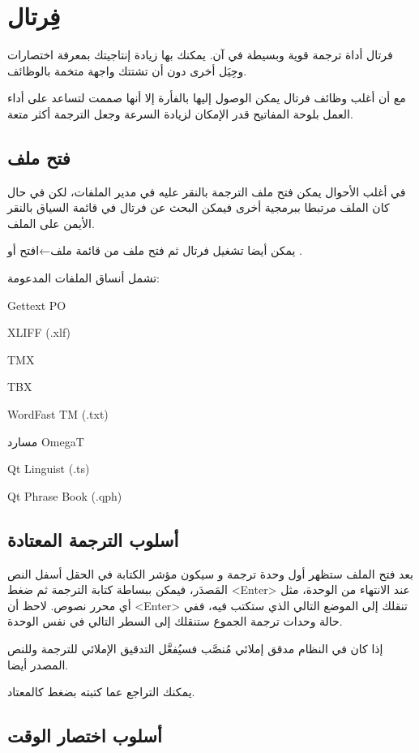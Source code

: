 \section{فِرتال}
فرتال أداة ترجمة قوية وبسيطة في آن. يمكنك بها زيادة إنتاجيتك بمعرفة
اختصارات وحِيَل أخرى دون أن تشتتك واجهة متخمة بالوظائف.

مع أن أغلب وظائف فرتال يمكن الوصول إليها بالفأرة إلا أنها صممت لتساعد
على أداء العمل بلوحة المفاتيح قدر الإمكان لزيادة السرعة وجعل الترجمة
أكثر متعة.

\subsection{فتح ملف}
في أغلب الأحوال يمكن فتح ملف الترجمة بالنقر عليه في مدير الملفات، لكن في
حال كان الملف مرتبطا ببرمجية أخرى فيمكن البحث عن فرتال في قائمة السياق
بالنقر الأيمن على الملف.

يمكن أيضا تشغيل فرتال ثم فتح ملف من قائمة ملف←افتح أو .

تشمل أنساق الملفات المدعومة:

\startitemize[1]
\item Gettext PO
\item {\sc XLIFF} (.xlf)
\item {\sc TMX}
\item {\sc TBX}
\item WordFast TM (.txt)
\item مسارد OmegaT
\item Qt Linguist (.ts)
\item Qt Phrase Book (.qph)
\stopitemize
\subsection{أسلوب الترجمة المعتادة}
بعد فتح الملف ستظهر أول وحدة ترجمة و سيكون مؤشر الكتابة في الحقل أسفل
النص المَصدَر، فيمكن ببساطة كتابة الترجمة ثم ضغط <Enter> عند الانتهاء
من الوحدة، مثل أي محرر نصوص. لاحظ أن <Enter> تنقلك إلى الموضع التالي
الذي ستكتب فيه، ففي حالة وحدات ترجمة الجموع ستنقلك إلى السطر التالي في
نفس الوحدة.

إذا كان في النظام مدقق إملائي مُنصَّب فسيُفعَّل التدقيق الإملائي للترجمة
وللنص المصدر أيضا.

يمكنك التراجع عما كتبته بضغط  كالمعتاد.

\subsection{أسلوب اختصار الوقت}

